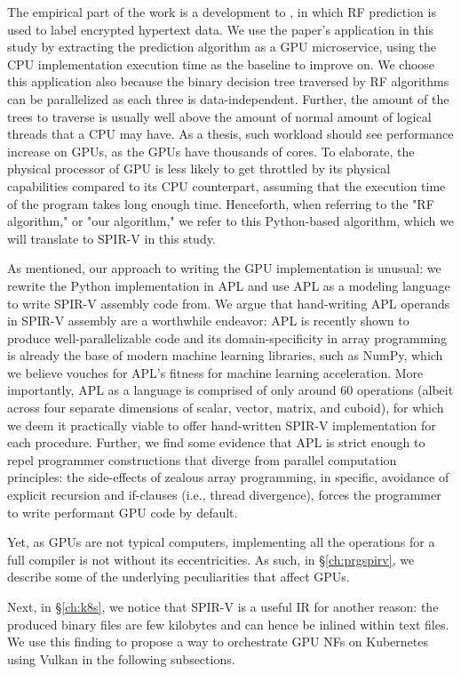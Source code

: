 \documentclass{IEEEtran}
\begin{document}
The empirical part of the work is a development to \cite{brissaud2019transparent}, in which \gls{RF} prediction is used to label encrypted hypertext data. We use the paper's application in this study by extracting the prediction algorithm as a GPU microservice, using the CPU implementation execution time as the baseline to improve on. We choose this application also because the binary decision tree traversed by \gls{RF} algorithms can be parallelized as each three is data-independent. Further, the amount of the trees to traverse is usually well above the amount of normal amount of logical threads that a CPU may have. As a thesis, such workload should see performance increase on GPUs, as the GPUs have thousands of cores. To elaborate, the physical processor of GPU is less likely to get throttled by its physical capabilities compared to its CPU counterpart, assuming that the execution time of the program takes long enough time. Henceforth, when referring to the "RF algorithm," or "our algorithm," we refer to this Python-based algorithm, which we will translate to SPIR-V in this study.

As mentioned, our approach to writing the GPU implementation is unusual: we rewrite the Python implementation in APL and use APL as a modeling language to write SPIR-V assembly code from. We argue that hand-writing APL operands in SPIR-V assembly are a worthwhile endeavor: APL is recently shown to produce well-parallelizable code \cite{hsu2016key} and its domain-specificity in array programming is already the base of modern machine learning libraries, such as NumPy, which we believe vouches for APL's fitness for machine learning acceleration. More importantly, APL as a language is comprised of only around 60 operations (albeit across four separate dimensions of scalar, vector, matrix, and cuboid), for which we deem it practically viable to offer hand-written SPIR-V implementation for each procedure. Further, we find some evidence that APL is strict enough to repel programmer constructions that diverge from parallel computation principles: the side-effects of zealous array programming, in specific, avoidance of explicit recursion and if-clauses (i.e., thread divergence), forces the programmer to write performant GPU code by default.

Yet, as GPUs are not typical computers, implementing all the operations for a full compiler is not without its eccentricities. As such, in §\ref{ch:prgspirv}, we describe some of the underlying peculiarities that affect GPUs.

Next, in §\ref{ch:k8s}, we notice that SPIR-V is a useful IR for another reason: the produced binary files are few kilobytes and can hence be inlined within text files. We use this finding to propose a way to orchestrate GPU \glspl{NF} on Kubernetes using Vulkan in the following subsections.
\end{document}
